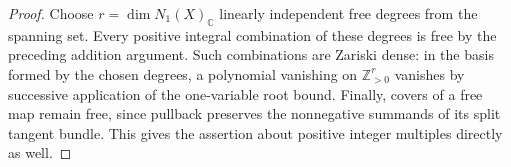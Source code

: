 \begin{proof}
Choose \(r=\dim N_1(X)_{\mathbb C}\) linearly independent free
degrees from the spanning set.  Every positive integral combination
of these degrees is free by the preceding addition argument.
Such combinations are Zariski dense: in the basis formed by the
chosen degrees, a polynomial vanishing on
\(\mathbb Z_{>0}^r\) vanishes by successive application of the
one-variable root bound.  Finally, covers of a free map remain
free, since pullback preserves the nonnegative summands of
its split tangent bundle.  This gives the assertion about positive
integer multiples directly as well.
\end{proof}
